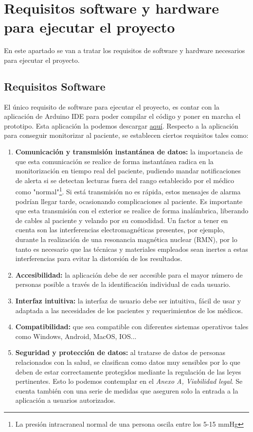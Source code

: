 
\section{Requisitos software y hardware para ejecutar el proyecto}
En este apartado se van a tratar los requisitos de software y hardware necesarios para ejecutar el proyecto.

\subsection{Requisitos Software}
El único requisito de software para ejecutar el proyecto, es contar con la aplicación de Arduino IDE para poder compilar el código y poner en marcha el prototipo. Esta aplicación la podemos descargar \href{https://apps.microsoft.com/detail/9nblggh4rsd8?hl=es-es&gl=US}{aquí}.
Respecto a la aplicación para conseguir monitorizar al paciente, se establecen ciertos requisitos tales como:
\begin{enumerate}
    \item \textbf{Comunicación y transmisión instantánea de datos:} la importancia de que esta comunicación se realice de forma instantánea radica en la monitorización en tiempo real del paciente, pudiendo mandar notificaciones de alerta si se detectan lecturas fuera del rango establecido por el médico como "normal"\footnote{La presión intracraneal normal de una persona oscila entre los 5-15 mmHg}. Si está transmisión no es rápida, estos mensajes de alarma podrían llegar tarde, ocasionando complicaciones al paciente. Es importante que esta transmisión con el exterior se realice de forma inalámbrica, liberando de cables al paciente y velando por su comodidad. Un factor a tener en cuenta son las interferencias electromagnéticas presentes, por ejemplo, durante la realización de una resonancia magnética nuclear (RMN), por lo tanto es necesario que las técnicas y materiales empleados sean inertes a estas interferencias para evitar la distorsión de los resultados.
    \item \textbf{Accesibilidad:} la aplicación debe de ser accesible para el mayor número de personas posible a través de la identificación individual de cada usuario.
    \item \textbf{Interfaz intuitiva:} la interfaz de usuario debe ser intuitiva, fácil de usar y adaptada a las necesidades de los pacientes y requerimientos de los médicos.
    \item \textbf{Compatibilidad:} que sea compatible con diferentes sistemas operativos tales como Windows, Android, MacOS, IOS...
    \item \textbf{Seguridad y protección de datos:} al tratarse de datos de personas relacionados con la salud, se clasifican como datos muy sensibles por lo que deben de estar correctamente protegidos mediante la regulación de las leyes pertinentes. Esto lo podemos contemplar en el \textit{Anexo A, Viabilidad legal}. Se cuenta también con una serie de medidas que aseguren solo la entrada a la aplicación a usuarios autorizados.
    
\end{enumerate}


